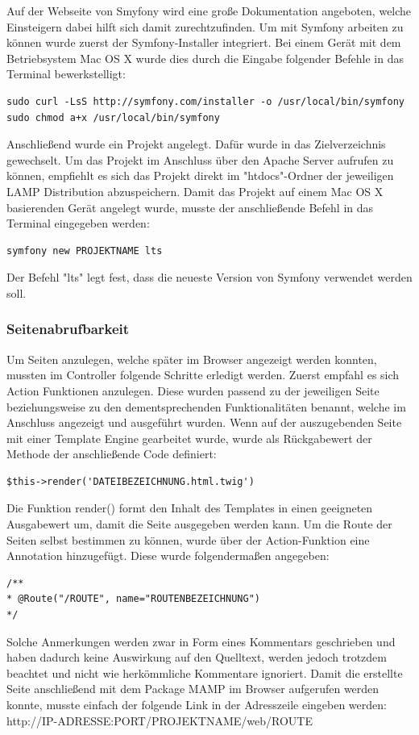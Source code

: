 Auf der {Webseite von Smyfony\cite{symfony}} wird eine große Dokumentation angeboten, welche Einsteigern dabei hilft sich damit zurechtzufinden. Um mit Symfony arbeiten zu können wurde zuerst der Symfony-Installer integriert. Bei einem Gerät mit dem Betriebsystem Mac OS X wurde dies durch die Eingabe folgender Befehle in das Terminal bewerkstelligt:
	\lstset{language = bash}
  	\begin{lstlisting}
sudo curl -LsS http://symfony.com/installer -o /usr/local/bin/symfony
sudo chmod a+x /usr/local/bin/symfony
  	\end{lstlisting}
Anschließend wurde ein Projekt angelegt. Dafür wurde in das Zielverzeichnis gewechselt. Um das Projekt im Anschluss über den Apache Server aufrufen zu können, empfiehlt es sich das Projekt direkt im "htdocs"-Ordner der jeweiligen LAMP Distribution abzuspeichern. Damit das Projekt auf einem Mac OS X basierenden Gerät angelegt wurde, musste der anschließende Befehl in das Terminal eingegeben werden:
	\lstset{language = bash}
  	\begin{lstlisting}
symfony new PROJEKTNAME lts
  	\end{lstlisting}
Der Befehl "lts" legt fest, dass die neueste Version von Symfony verwendet werden soll.

    \subsubsection{Seitenabrufbarkeit}

Um Seiten anzulegen, welche später im Browser angezeigt werden konnten, mussten im Controller folgende Schritte erledigt werden. Zuerst empfahl es sich Action Funktionen anzulegen. Diese wurden passend zu der jeweiligen Seite beziehungsweise zu den dementsprechenden Funktionalitäten benannt, welche im Anschluss angezeigt und ausgeführt wurden. Wenn auf der auszugebenden Seite mit einer Template Engine gearbeitet wurde, wurde als Rückgabewert der Methode der anschließende Code definiert:
	
	\lstset{language=php}
  	\begin{lstlisting}
$this->render('DATEIBEZEICHNUNG.html.twig')
  	\end{lstlisting}
Die Funktion render() formt den Inhalt des Templates in einen geeigneten Ausgabewert um, damit die Seite ausgegeben werden kann.
Um die Route der Seiten selbst bestimmen zu können, wurde über der Action-Funktion eine Annotation hinzugefügt. Diese wurde folgendermaßen angegeben:
	\lstset{language=php}
  	\begin{lstlisting}
/**
* @Route("/ROUTE", name="ROUTENBEZEICHNUNG")
*/
  	\end{lstlisting}
Solche Anmerkungen werden zwar in Form eines Kommentars geschrieben und haben dadurch keine Auswirkung auf den Quelltext, werden jedoch trotzdem beachtet und nicht wie herkömmliche Kommentare ignoriert.
Damit die erstellte Seite anschließend mit dem Package MAMP im Browser aufgerufen werden konnte, musste einfach der folgende Link in der Adresszeile eingeben werden:\\
http://IP-ADRESSE:PORT/PROJEKTNAME/web/ROUTE

